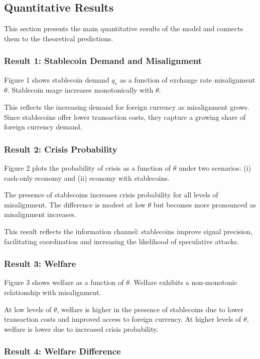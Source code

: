 \subsection{Quantitative Results}

This section presents the main quantitative results of the model and connects them to the theoretical predictions.

\subsubsection{Result 1: Stablecoin Demand and Misalignment}

Figure 1 shows stablecoin demand $q_s$ as a function of exchange rate misalignment $\theta$. Stablecoin usage increases monotonically with $\theta$.

This reflects the increasing demand for foreign currency as misalignment grows. Since stablecoins offer lower transaction costs, they capture a growing share of foreign currency demand.

\subsubsection{Result 2: Crisis Probability}

Figure 2 plots the probability of crisis as a function of $\theta$ under two scenarios: (i) cash-only economy and (ii) economy with stablecoins.

The presence of stablecoins increases crisis probability for all levels of misalignment. The difference is modest at low $\theta$ but becomes more pronounced as misalignment increases.

This result reflects the information channel: stablecoins improve signal precision, facilitating coordination and increasing the likelihood of speculative attacks.

\subsubsection{Result 3: Welfare}

Figure 3 shows welfare as a function of $\theta$. Welfare exhibits a non-monotonic relationship with misalignment.

At low levels of $\theta$, welfare is higher in the presence of stablecoins due to lower transaction costs and improved access to foreign currency. At higher levels of $\theta$, welfare is lower due to increased crisis probability.

\subsubsection{Result 4: Welfare Difference}

